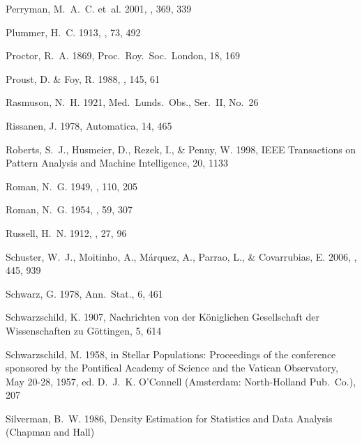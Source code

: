 \begin{thebibliography}{99}
{Perryman}, M.~A.~C. {et~al.} 2001, \aap, 369, 339

{Plummer}, H.~C. 1913, \mnras, 73, 492

{Proctor}, R.~A. 1869, Proc.~Roy.~Soc.~London, 18, 169

{Proust}, D. \& {Foy}, R. 1988, \apss, 145, 61

{Rasmuson}, N.~H. 1921, Med.~Lunds.~Obs., {Ser.~II}, {No.~26}

{Rissanen}, J. 1978, {Automatica}, 14, 465

{Roberts}, S.~J., {Husmeier}, D., {Rezek}, I., \& {Penny}, W. 1998, IEEE
  Transactions on Pattern Analysis and Machine Intelligence, 20, 1133

{Roman}, N.~G. 1949, \apj, 110, 205

{Roman}, N.~G. 1954, \aj, 59, 307

{Russell}, H.~N. 1912, \aj, 27, 96

{Schuster}, W.~J., {Moitinho}, A., {M{\'a}rquez}, A., {Parrao}, L., \&
  {Covarrubias}, E. 2006, \aap, 445, 939

{Schwarz}, G. 1978, {Ann.~Stat.}, 6, 461

{Schwarzschild}, K. 1907, {Nachrichten von der K{\"o}niglichen Gesellschaft der
  Wissenschaften zu G{\"o}ttingen}, 5, {614}

{Schwarzschild}, M. 1958, in {Stellar Populations: Proceedings of the
  conference sponsored by the Pontifical Academy of Science and the Vatican
  Observatory, May 20-28, 1957}, ed. D.~J.~K. {O'Connell} ({Amsterdam}:
  {North-Holland Pub.~Co.}), 207

{Silverman}, B.~W. 1986, {Density Estimation for Statistics and Data Analysis}
  ({Chapman and Hall})


\end{thebibliography}
